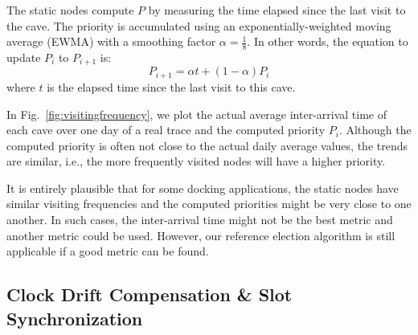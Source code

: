 \documentclass[twoside,twocolumn]{article}
\begin{document}
The static nodes compute $P$ by measuring the time elapsed since the
last visit to the cave. The priority is accumulated using an
exponentially-weighted moving average (EWMA) with a smoothing factor
$\alpha = \frac{1}{8}$.  In other words, the equation to update $P_i$
to $P_{i+1}$ is:
\begin{equation}\label{eq1}
	P_{i+1} = \alpha t + (1 - \alpha) P_i
\end{equation}
where $t$ is the elapsed time since the last visit to this cave.

In Fig.~\ref{fig:visitingfrequency}, we plot the actual average
inter-arrival time of each cave over one day of a real trace and the
computed priority $P_i$.  Although the computed priority is often not
close to the actual daily average values, the trends are similar,
i.e., the more frequently visited nodes will have a higher priority.

It is entirely plausible that for some docking applications, the
static nodes have similar visiting frequencies and the computed
priorities might be very close to one another. In such cases, the
inter-arrival time might not be the best metric and another metric
could be used. However, our reference election algorithm is still
applicable if a good metric can be found.

\subsection{Clock Drift Compensation \& Slot Synchronization}
\label{sec:clock-drift}
\end{document}
